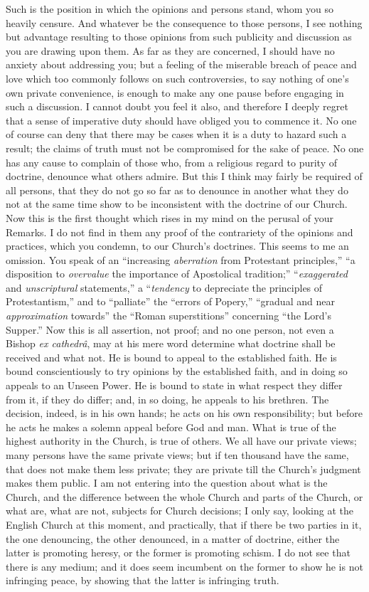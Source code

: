 Such is the position in which the opinions and
persons stand, whom you so heavily censure. And whatever be the
consequence to those persons, I see nothing but advantage resulting to
those opinions from such publicity and discussion as you are drawing
upon them. As far as they are concerned, I should have no anxiety
about addressing you; but a feeling of the miserable breach of peace
and love which too commonly follows on such controversies, to say
nothing of one's own private convenience, is enough to make any one
pause before engaging in such a discussion. I cannot doubt you feel it
also, and therefore I deeply regret that a sense of imperative duty
should have obliged you to commence it. No one of course can deny that
there may be cases when it is a duty to hazard such a result; the
claims of truth must not be compromised for the sake of peace. No one
has any cause to complain of those who, from a religious regard to
purity of doctrine, denounce what others admire. But this I think may
fairly be required of all persons, that they do not go so far as to
denounce in another what they do not at the same time show to be
inconsistent with the doctrine of our Church. Now this is the first
thought which rises in my mind on the perusal of your Remarks. I do
not find in them any proof of the contrariety of the opinions and
practices, which you condemn, to our Church's doctrines. This seems
to me an omission. You speak of an ``increasing \emph{aberration}
from Protestant principles,'' ``a disposition to \emph{overvalue}
the importance of Apostolical tradition;'' ``\emph{exaggerated}
and \emph{unscriptural} statements,'' a ``\emph{tendency} to
depreciate the principles of Protestantism,'' and to ``palliate''
the ``errors of Popery,'' ``gradual and near \emph{approximation}
towards'' the ``Roman superstitions'' concerning ``the Lord's
Supper.'' Now this is all assertion, not proof; and no one person,
not even a Bishop \emph{ex cathedrâ}, may at his mere word determine
what doctrine shall be received and what not. He is bound to appeal to
the established faith. He is bound conscientiously to try opinions by
the established faith, and in doing so appeals to an Unseen Power. He
is bound to state in what respect they differ from it, if they do
differ; and, in so doing, he appeals to his brethren. The decision,
indeed, is in his own hands; he acts on his own responsibility; but
before he acts he makes a solemn appeal before God and man. What is
true of the highest authority in the Church, is true of others. We all
have our private views; many persons have the same private views; but
if ten thousand have the same, that does not make them less private;
they are private till the Church's judgment makes them public. I am
not entering into the question about what is the Church, and the
difference between the whole Church and parts of the Church, or what
are, what are not, subjects for Church decisions; I only say, looking
at the English Church at this moment, and practically, that if there
be two parties in it, the one denouncing, the other denounced, in a
matter of doctrine, either the latter is promoting heresy, or the
former is promoting schism. I do not see that there is any medium; and
it does seem incumbent on the former to show he is not infringing
peace, by showing that the latter is infringing truth.

